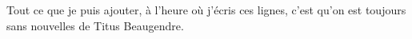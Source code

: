 Tout ce que je puis ajouter, à l’heure où j’écris ces lignes, c’est qu’on est toujours sans nouvelles de Titus Beaugendre.
